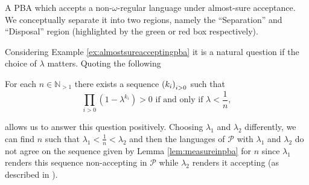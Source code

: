 \begin{drawing}
  \caption{A \ac{PBA} which accepts a non-$\omega$-regular language under
  almost-sure acceptance. We conceptually separate it into two regions, namely
  the \enquote{Separation} and \enquote{Disposal} region (highlighted by the
  green or red box respectively).}
  \label{fig:almostsureacceptingpba}
  \begin{center}
  \end{center}
\end{drawing}
Considering Example \ref{ex:almostsureacceptingpba} it is a natural question if
the choice of $\lambda$ matters. Quoting the following
\begin{lemma}
  \cite[Lemma 1]{DecProblemsForProbAuto}
  For each $n\in\mathbb{N}_{>1}$ there exists a sequence $\left(k_{i}\right)_{i>0}$
  such that
  \begin{equation*}
    \prod_{i>0}(1-\lambda^{k_{i}}) > 0 \text{ if and only if }
    \lambda<\frac{1}{n},
  \end{equation*}
  \label{lem:measureinpba}
\end{lemma}
allows us to answer this question positively. Choosing $\lambda_{1}$ and
$\lambda_{2}$ differently, we can find $n$ such that 
$\lambda_{1} < \frac{1}{n} < \lambda_{2}$ and then the languages of 
$\mathcal{P}$ with $\lambda_{1}$ and $\lambda_{2}$ do not agree on the sequence
given by Lemma \ref{lem:measureinpba} for $n$ since $\lambda_{1}$ renders
this sequence non-accepting in $\mathcal{P}$ while $\lambda_{2}$ renders it
accepting (as described in \cite{DecProblemsForProbAuto}).

